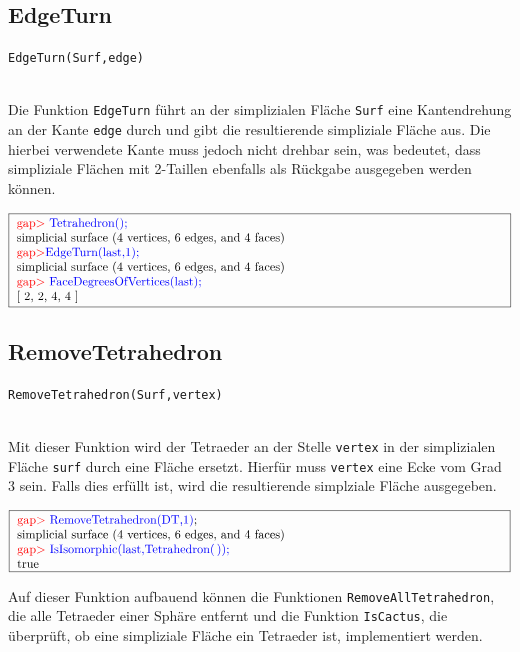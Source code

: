 \documentclass[12pt,titlepage,twoside,cleardoublepage]{article}
\theoremstyle{nummermitklammern}
\numberwithin{equation}{section}
\begin{document}
\subsection{EdgeTurn}
\begin{large}
\texttt{EdgeTurn(Surf,edge)}
\end{large}\\
Die Funktion \texttt{EdgeTurn} führt an der simplizialen Fläche \texttt{Surf} eine Kantendrehung an der Kante \texttt{edge} durch und gibt die resultierende simpliziale Fläche aus. Die hierbei verwendete Kante muss jedoch nicht drehbar sein, was bedeutet, dass simpliziale Flächen mit 2-Taillen ebenfalls als Rückgabe ausgegeben werden können. 
\begin{center}
$\fbox{
\parbox{14cm}{
\textcolor{red}{gap$>$} \textcolor{blue}{Tetrahedron();}\newline
simplicial surface (4 vertices, 6 edges, and 4 faces)\newline
\textcolor{red}{gap$>$}\textcolor{blue}{ EdgeTurn(last,1);}\newline
simplicial surface (4 vertices, 6 edges, and 4 faces)\newline
\textcolor{red}{gap$>$} \textcolor{blue}{FaceDegreesOfVertices(last);}\newline
[ 2, 2, 4, 4 ]
}
}$
\end{center}

\subsection{RemoveTetrahedron}
\begin{large}
\texttt{RemoveTetrahedron(Surf,vertex)}
\end{large}\\
Mit dieser Funktion wird der Tetraeder an der Stelle \texttt{vertex} in der simplizialen Fläche \texttt{surf} durch eine Fläche ersetzt. Hierfür muss \texttt{vertex} eine Ecke vom Grad 3 sein. Falls dies erfüllt ist, wird die resultierende simplziale Fläche ausgegeben. 
\begin{center}
$\fbox{
\parbox{14cm}{
\textcolor{red}{gap$>$} \textcolor{blue}{RemoveTetrahedron(DT,1)};\newline
simplicial surface (4 vertices, 6 edges, and 4 faces)\newline
\textcolor{red}{gap$>$} \textcolor{blue}{IsIsomorphic(last,Tetrahedron(\,));}\newline
true
}
}$
\end{center}
Auf dieser Funktion aufbauend können die Funktionen \texttt{RemoveAllTetrahedron}, die alle Tetraeder einer Sphäre entfernt und die Funktion \texttt{IsCactus}, die überprüft, ob eine simpliziale Fläche ein Tetraeder ist, implementiert werden.
\end{document}
